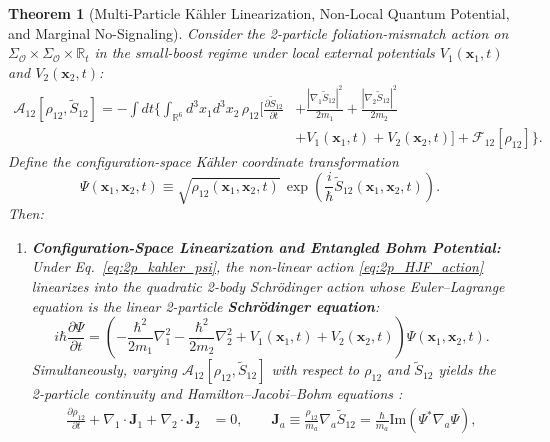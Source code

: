 \documentclass[11pt, a4paper]{article}
\newtheorem{theorem}{Theorem}[section]
\theoremstyle{definition}
\begin{document}
\begin{theorem}[Multi-Particle K\"{a}hler Linearization, Non-Local Quantum Potential, and Marginal No-Signaling]
\label{thm:entanglement_nosignaling}
Consider the 2-particle foliation-mismatch action on $\Sigma_{\mathcal{O}} \times \Sigma_{\mathcal{O}} \times \mathbb{R}_t$ in the small-boost regime under local external potentials $V_1(\mathbf{x}_1, t)$ and $V_2(\mathbf{x}_2, t)$:
\begin{equation}
\label{eq:2p_HJF_action}
\begin{aligned}
\mathcal{A}_{12}[\rho_{12}, \tilde{S}_{12}] = -\int dt \Bigg\{ \int_{\mathbb{R}^6} d^3x_1 d^3x_2\,\rho_{12} \bigg[ \frac{\partial \tilde{S}_{12}}{\partial t} &+ \frac{|\nabla_1 \tilde{S}_{12}|^2}{2m_1} + \frac{|\nabla_2 \tilde{S}_{12}|^2}{2m_2} \\
&+ V_1(\mathbf{x}_1, t) + V_2(\mathbf{x}_2, t) \bigg] + \mathcal{F}_{12}[\rho_{12}] \Bigg\}.
\end{aligned}
\end{equation}
Define the configuration-space K\"{a}hler coordinate transformation
\begin{equation}
\label{eq:2p_kahler_psi}
\Psi(\mathbf{x}_1, \mathbf{x}_2, t) \equiv \sqrt{\rho_{12}(\mathbf{x}_1, \mathbf{x}_2, t)} \, \exp\left( \frac{i}{\hbar}\tilde{S}_{12}(\mathbf{x}_1, \mathbf{x}_2, t) \right).
\end{equation}
Then:
\begin{enumerate}[label=(\roman*)]
    \item \textbf{Configuration-Space Linearization and Entangled Bohm Potential:} Under Eq.~\eqref{eq:2p_kahler_psi}, the non-linear action \eqref{eq:2p_HJF_action} linearizes into the quadratic 2-body Schr\"{o}dinger action whose Euler--Lagrange equation is the linear 2-particle \textbf{Schr\"{o}dinger equation}:
    \begin{equation}
    \label{eq:2p_schrodinger}
    i\hbar\frac{\partial \Psi}{\partial t} = \left( -\frac{\hbar^2}{2m_1}\nabla_1^2 - \frac{\hbar^2}{2m_2}\nabla_2^2 + V_1(\mathbf{x}_1, t) + V_2(\mathbf{x}_2, t) \right) \Psi(\mathbf{x}_1, \mathbf{x}_2, t).
    \end{equation}
    Simultaneously, varying $\mathcal{A}_{12}[\rho_{12}, \tilde{S}_{12}]$ with respect to $\rho_{12}$ and $\tilde{S}_{12}$ yields the 2-particle continuity and Hamilton--Jacobi--Bohm equations \cite{Bohm1952}:
    \begin{align}
    \frac{\partial \rho_{12}}{\partial t} + \nabla_1 \cdot \mathbf{J}_1 + \nabla_2 \cdot \mathbf{J}_2 &= 0, \qquad \mathbf{J}_a \equiv \frac{\rho_{12}}{m_a}\nabla_a \tilde{S}_{12} = \frac{\hbar}{m_a}\text{Im}\left(\Psi^* \nabla_a \Psi\right), \label{eq:2p_continuity} \\

\end{align}
\end{enumerate}
\end{theorem}
\end{document}
